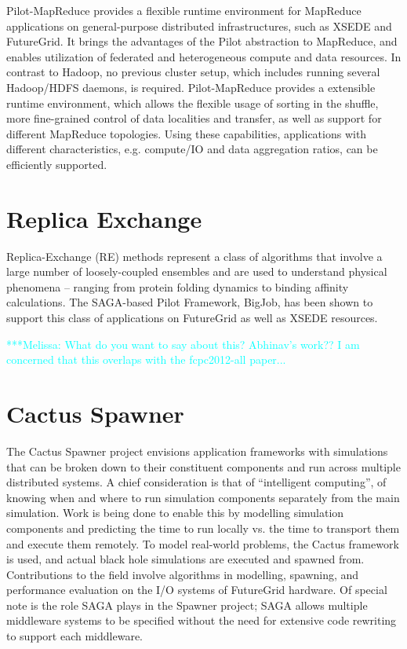 \documentclass[]{paper}
\newcommand{\mrnote}[1]{ {\textcolor{cyan} { ***Melissa: #1 }}}
\newcommand{\mrnote}[1]{}
\begin{document}
Pilot-MapReduce provides a flexible runtime environment for MapReduce applications on general-purpose distributed infrastructures, such as XSEDE and FutureGrid. It brings the advantages of the Pilot abstraction to MapReduce, and enables utilization of federated and heterogeneous compute and data resources. In contrast to Hadoop, no previous cluster setup, which includes running several Hadoop/HDFS daemons, is required. Pilot-MapReduce provides a extensible runtime environment, which allows the flexible usage of sorting in the shuffle, more fine-grained control of data localities and transfer, as well as support for different MapReduce topologies. Using these capabilities, applications with different characteristics, e.g. compute/IO and data aggregation ratios, can be efficiently supported.



\section{Replica Exchange}

Replica-Exchange (RE) methods represent a class of algorithms that involve a large number of loosely-coupled ensembles 
and are used to understand physical phenomena – ranging from protein folding dynamics to binding affinity calculations. The SAGA-based Pilot Framework, BigJob, has been shown to support this class of applications on FutureGrid as well as XSEDE resources.

\mrnote{What do you want to say about this? Abhinav's work?? I am concerned that this overlaps with the fcpc2012-all paper...}

\section{Cactus Spawner}
The Cactus Spawner project envisions application frameworks with simulations that
can be broken down to their constituent components and run across multiple
distributed systems.  A chief consideration is that of ``intelligent computing'',
of knowing when and where to run simulation components separately from the main
simulation.  Work is being done to enable this by modelling simulation components
and predicting the time to run locally vs. the time to transport them and execute
them remotely.  To model real-world problems, the Cactus framework is used, and
actual black hole simulations are executed and spawned from.  Contributions
to the field involve algorithms in modelling, spawning, and performance evaluation on
the I/O systems of FutureGrid hardware.  Of special note is the role SAGA plays in the
Spawner project; SAGA allows multiple middleware systems to be specified without the need
for extensive code rewriting to support each middleware.
\end{document}
